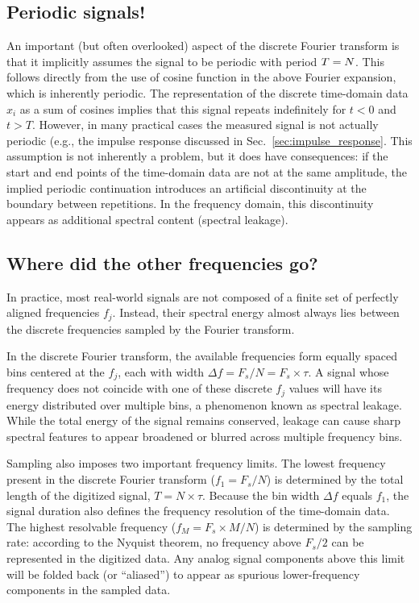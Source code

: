 \documentclass[12pt,a4paper]{article}
\providecommand{\seclabel}[1]{\label{sec:#1}}
\providecommand{\secn}[1]{Sec.~\ref{sec:#1}}
\begin{document}
\subsection{Periodic signals!}\seclabel{Fourier_periodic}
An important (but often overlooked) aspect of the discrete Fourier transform is that it implicitly assumes the signal to be periodic with period $T = N \time \tau$.  
This follows directly from the use of cosine function in the above Fourier expansion, which is inherently periodic. The representation of the discrete time-domain data $x_i$ as a sum of cosines implies that this signal repeats indefinitely for $t < 0$ and $t > T$.  
However, in many practical cases the measured signal is not actually periodic (e.g., the impulse response discussed in \secn{impulse_response}. This assumption is not inherently a problem, but it does have consequences: if the start and end points of the time-domain data are not at the same amplitude, the implied periodic continuation introduces an artificial discontinuity at the boundary between repetitions. In the frequency domain, this discontinuity appears as additional spectral content (spectral leakage).

\subsection{Where did the other frequencies go?}
In practice, most real-world signals are not composed of a finite set of perfectly aligned frequencies $f_j$.  
Instead, their spectral energy almost always lies between the discrete frequencies sampled by the Fourier transform.

In the discrete Fourier transform, the available frequencies form equally spaced bins centered at the $f_j$, each with width $\Delta f = F_s/N = F_s \times \tau$.
A signal whose frequency does not coincide with one of these discrete $f_j$ values will have its energy distributed over multiple bins, a phenomenon known as spectral leakage. While the total energy of the signal remains conserved, leakage can cause sharp spectral features to appear broadened or blurred across multiple frequency bins.

Sampling also imposes two important frequency limits.  
The lowest frequency present in the discrete Fourier transform ($f_1 = F_s/N$) is determined by the total length of the digitized signal, $T = N \times \tau$.  
Because the bin width $\Delta f$ equals $f_1$, the signal duration also defines the frequency resolution of the time-domain data.  
The highest resolvable frequency ($f_M = F_s \times M / N$) is determined by the sampling rate: according to the Nyquist theorem, no frequency above $F_s/2$ can be represented in the digitized data.  
Any analog signal components above this limit will be folded back (or ``aliased'') to appear as spurious lower-frequency components in the sampled data.
\end{document}
